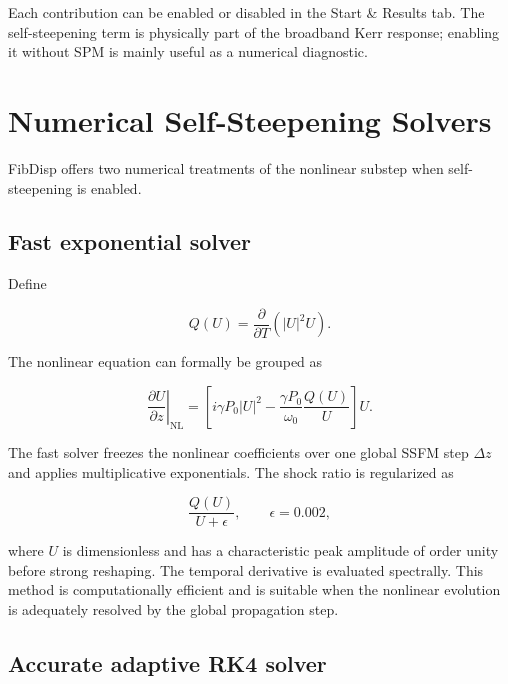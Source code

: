 \documentclass[11pt,a4paper]{article}
\begin{document}
Each contribution can be enabled or disabled in the Start \& Results tab.
The self-steepening term is physically part of the broadband Kerr response;
enabling it without SPM is mainly useful as a numerical diagnostic.

\section{Numerical Self-Steepening Solvers}

FibDisp offers two numerical treatments of the nonlinear substep when
self-steepening is enabled.

\subsection{Fast exponential solver}

Define

\begin{equation}
Q(U)=\frac{\partial}{\partial T}\left(|U|^2U\right).
\end{equation}

The nonlinear equation can formally be grouped as

\begin{equation}
\left.
\frac{\partial U}{\partial z}
\right|_{\mathrm{NL}}
=
\left[
 i\gamma P_0|U|^2
-
\frac{\gamma P_0}{\omega_0}
\frac{Q(U)}{U}
\right]U.
\end{equation}

The fast solver freezes the nonlinear coefficients over one global SSFM step
$\Delta z$ and applies multiplicative exponentials. The shock ratio is
regularized as

\begin{equation}
\frac{Q(U)}{U+\epsilon},
\qquad
\epsilon=0.002,
\end{equation}

where $U$ is dimensionless and has a characteristic peak amplitude of order
unity before strong reshaping. The temporal derivative is evaluated
spectrally. This method is computationally efficient and is suitable when the
nonlinear evolution is adequately resolved by the global propagation step.

\subsection{Accurate adaptive RK4 solver}
\end{document}
